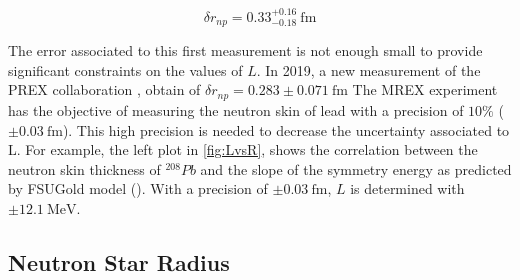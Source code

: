 \begin{equation} \label{eq:Prex}
\delta r_{np} = 0.33^{+0.16}_{-0.18} \SI{}{\femto \meter}
\end{equation}

The error associated to this first measurement is not enough small to provide significant constraints on the values of $L$. In 2019, a new measurement of the PREX collaboration \cite{PREX:2021umo}, obtain of $\delta r_{np} = 0.283 \pm 0.071 \SI{}{\femto \meter}$ The MREX experiment has the objective of measuring the neutron skin of lead with a precision of $10 \%$  ($\pm \SI{0.03}{\femto \meter}$). This high precision is needed to decrease the uncertainty associated to L. For example, the left plot in \ref{fig:LvsR}, shows the correlation between the neutron skin thickness of $^{208}Pb$ and the slope of the symmetry energy as predicted by FSUGold model (\cite{Fattoyev_2011}). With a precision of $\pm \SI{0.03}{\femto \meter}$, $L$ is determined with $\pm \SI{12.1}{\mega \electronvolt}$. 

\subsection{Neutron Star Radius}

